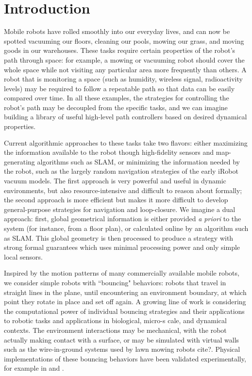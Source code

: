 \documentclass[]{svproc}  %
\begin{document}
\section{Introduction}

Mobile robots have rolled smoothly into our everyday lives, and can now be
spotted vacuuming our floors, cleaning our pools, mowing our grass, and moving
goods in our warehouses. These tasks require certain properties of
the robot's path through space: for example, a mowing or
vacuuming robot should cover the whole space while not visiting 
any particular area more frequently than others. A robot that is monitoring a space 
(such as humidity, wireless signal, radioactivity levels) may be
required to follow a repeatable path so that data can be easily compared 
over time. In all these examples, the strategies for controlling the robot's
path may be decoupled from the specific tasks, and we can imagine building a
library of useful high-level path controllers based on desired dynamical
properties.

Current algorithmic approaches to these tasks take two flavors: either
maximizing the information available to the robot though high-fidelity sensors
and map-generating algorithms such as SLAM, or minimizing the information needed
by the robot, such as the largely random navigation strategies of the early
iRobot vacuum models. The first approach is very powerful and useful in
dynamic environments, but also
resource-intensive and difficult to reason about formally; the second approach 
is more efficient but makes it more difficult to develop general-purpose strategies 
for navigation and loop-closure. We imagine a dual
approach: first, global geometrical information is either provided \emph{a
priori} to the system (for instance, from a floor plan), or calculated online by
an algorithm such as SLAM. This global geometry is then processed to produce
a strategy with strong formal guarantees which uses minimal processing power 
and only simple local sensors.

Inspired by the motion patterns of many commercially available mobile robots, 
we consider simple robots with ``bouncing" behaviors: robots that
travel in straight lines in the plane, until encountering an environment
boundary, at which point they rotate in place and set off again. A growing line
of work is considering the computational power of individual bouncing strategies
and their applications to robotic tasks and applications in biological, micro-s
cale, and dynamical contexts. The environment interactions may be mechanical,
with the robot actually making contact with a surface, or may be simulated with
virtual walls such as the wire-in-ground systems used by lawn mowing robots
{\color{red} cite?}. Physical implementations of these bouncing behaviors have
been validated experimentally, for example in \cite{LewOKa13} and
\cite{alam2018space}.
\end{document}
